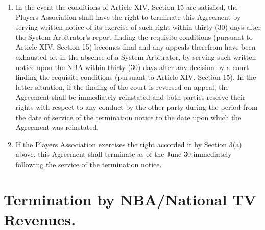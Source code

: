 \documentclass[
]{book}
\providecommand{\tightlist}{%
  \setlength{\itemsep}{0pt}\setlength{\parskip}{0pt}}
\begin{document}
\begin{enumerate}
\def\labelenumi{(\alph{enumi})}
\tightlist
\item
  In the event the conditions of Article XIV, Section 15 are satisfied, the Players Association shall have the right to terminate this Agreement by serving written notice of its exercise of such right within thirty (30) days after the System Arbitrator's report finding the requisite conditions (pursuant to Article XIV, Section 15) becomes final and any appeals therefrom have been exhausted or, in the absence of a System Arbitrator, by serving such written notice upon the NBA within thirty (30) days after any decision by a court finding the requisite conditions (pursuant to Article XIV, Section 15). In the latter situation, if the finding of the court is reversed on appeal, the Agreement shall be immediately reinstated and both parties reserve their rights with respect to any conduct by the other party during the period from the date of service of the termination notice to the date upon which the Agreement was reinstated.
\item
  If the Players Association exercises the right accorded it by Section 3(a) above, this Agreement shall terminate as of the June 30 immediately following the service of the termination notice.
\end{enumerate}

\hypertarget{termination-by-nbanational-tv-revenues.}{%
\section{Termination by NBA/National TV Revenues.}\label{termination-by-nbanational-tv-revenues.}}
\end{document}
